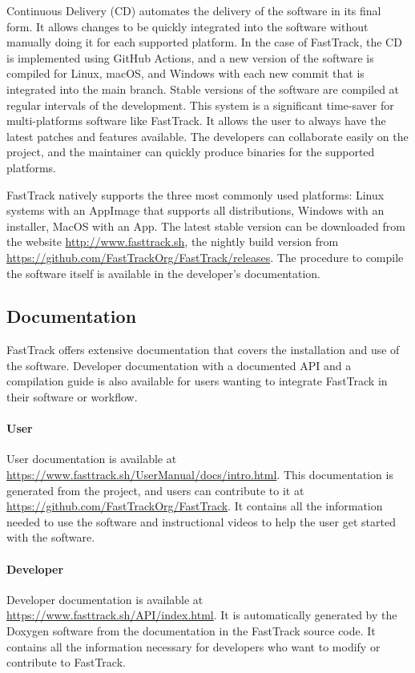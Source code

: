     Continuous Delivery (CD) automates the delivery of the software in its final form. It allows changes to be quickly integrated into the software without manually doing it for each supported platform. In the case of FastTrack, the CD is implemented using GitHub Actions, and a new version of the software is compiled for Linux, macOS, and Windows with each new commit that is integrated into the main branch. Stable versions of the software are compiled at regular intervals of the development. This system is a significant time-saver for multi-platforms software like FastTrack. It allows the user to always have the latest patches and features available. The developers can collaborate easily on the project, and the maintainer can quickly produce binaries for the supported platforms.

    FastTrack natively supports the three most commonly used platforms: Linux systems with an AppImage that supports all distributions, Windows with an installer, MacOS with an App. The latest stable version can be downloaded from the website \url{http://www.fasttrack.sh}, the nightly build version from \url{https://github.com/FastTrackOrg/FastTrack/releases}. The procedure to compile the software itself is available in the developer's documentation.

    \subsection{Documentation}
    FastTrack offers extensive documentation that covers the installation and use of the software. Developer documentation with a documented API and a compilation guide is also available for users wanting to integrate FastTrack in their software or workflow.

    \paragraph{User} User documentation is available at \url{https://www.fasttrack.sh/UserManual/docs/intro.html}. This documentation is generated from the project, and users can contribute to it at \url{https://github.com/FastTrackOrg/FastTrack}. It contains all the information needed to use the software and instructional videos to help the user get started with the software.
    \paragraph{Developer} Developer documentation is available at \url{https://www.fasttrack.sh/API/index.html}. It is automatically generated by the Doxygen software from the documentation in the FastTrack source code. It contains all the information necessary for developers who want to modify or contribute to FastTrack.


